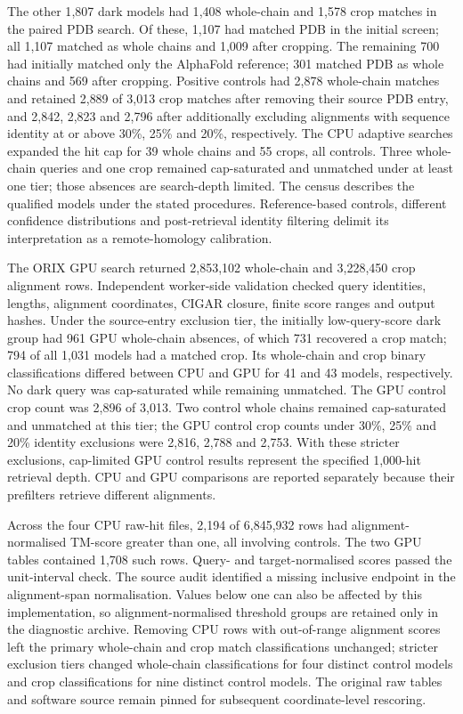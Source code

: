 \documentclass[11pt]{article}
\begin{document}
The other 1{,}807 dark models had 1{,}408 whole-chain and 1{,}578 crop matches in the paired
PDB search. Of these, 1{,}107 had matched PDB in the initial screen; all 1{,}107 matched as
whole chains and 1{,}009 after cropping. The remaining 700 had initially matched only the
AlphaFold reference; 301 matched PDB as whole chains and 569 after cropping.
Positive controls had 2{,}878 whole-chain matches and retained 2{,}889 of 3{,}013 crop matches after removing their source PDB entry,
and 2{,}842, 2{,}823 and 2{,}796 after additionally excluding alignments with sequence identity
at or above 30\%, 25\% and 20\%, respectively. The CPU adaptive searches expanded the hit cap
for 39 whole chains and 55 crops, all controls. Three whole-chain queries and one crop remained
cap-saturated and unmatched under at least one tier; those absences are search-depth limited.
The census describes the qualified models under the stated procedures. Reference-based
controls, different confidence distributions and post-retrieval identity filtering delimit
its interpretation as a remote-homology calibration.

The ORIX GPU search returned 2{,}853{,}102 whole-chain and 3{,}228{,}450 crop alignment rows.
Independent worker-side validation checked query identities, lengths, alignment coordinates,
CIGAR closure, finite score ranges and output hashes. Under the source-entry exclusion tier,
the initially low-query-score dark group had 961 GPU whole-chain absences, of which 731
recovered a crop match; 794 of all 1{,}031 models had a matched crop. Its whole-chain and crop
binary classifications differed between CPU and GPU for 41 and 43 models, respectively.
No dark query was cap-saturated while remaining unmatched. The GPU control crop count was
2{,}896 of 3{,}013. Two control whole chains remained cap-saturated and unmatched at this tier;
the GPU control crop counts under 30\%, 25\% and 20\% identity exclusions were 2{,}816,
2{,}788 and 2{,}753. With these stricter exclusions, cap-limited GPU control results represent the specified
1{,}000-hit retrieval depth. CPU and GPU comparisons are reported separately because their
prefilters retrieve different alignments.

Across the four CPU raw-hit files, 2{,}194 of 6{,}845{,}932 rows had alignment-normalised
TM-score greater than one, all involving controls. The two GPU tables contained 1{,}708 such
rows. Query- and target-normalised scores passed the unit-interval check. The source audit
identified a missing inclusive endpoint in the alignment-span normalisation. Values below one
can also be affected by this implementation, so alignment-normalised threshold groups are
retained only in the diagnostic archive. Removing CPU rows with out-of-range alignment scores
left the primary whole-chain and crop match classifications unchanged; stricter exclusion tiers
changed whole-chain classifications for four distinct control models and crop classifications
for nine distinct control models. The original raw tables and
software source remain pinned for subsequent coordinate-level rescoring.
\end{document}
